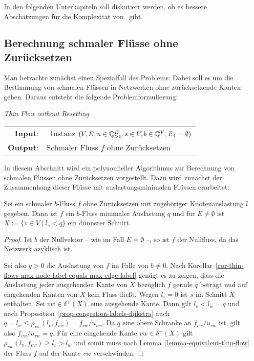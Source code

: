 In den folgenden Unterkapiteln soll diskutiert werden, ob es bessere Abschätzungen für die Komplexität von \probTFwR\ gibt.

\subsection{Berechnung schmaler Flüsse ohne Zurücksetzen}

Man betrachte zunächst einen Spezialfall des Problems:
Dabei soll es um die Bestimmung von schmalen Flüssen in Netzwerken ohne zurücksetzende Kanten gehen.
Daraus entsteht die folgende Problemformulierung:

\begin{center}
	\begin{mdframed}
		\centering
		\emph{Thin Flow without Resetting \probTFwoR} \\[1em]
		\begin{tabular}{rl}
			{\bfseries Input}: &\problemThinFlow\ Instanz $(V, E, u \in \mathbb{Q}^E_{>0}, s\in V, b\in \mathbb{Q}^V, E_1=\emptyset)$\\
			{\bfseries Output}: &Schmaler Fluss $f$ ohne Zurücksetzen
		\end{tabular}
	\end{mdframed}
\end{center}

In diesem Abschnitt wird ein polynomieller Algorithmus zur Berechnung von schmalen Flüssen ohne Zurücksetzen vorgestellt.
Dazu wird zunächst der Zusammenhang dieser Flüsse mit auslastungsminimalen Flüssen erarbeitet:

\begin{lemma}\label{lemma-thin-flows-without-resetting-have-minimal-congestion}
	Sei ein schmaler $b$-Fluss $f$ ohne Zurücksetzen mit zugehöriger Knotenauslastung $l$ gegeben.
	Dann ist $f$ ein $b$-Fluss minimaler Auslastung $q$ und für  $E\neq\emptyset$ ist $X:=\{ v\in V \mid l_v < q \}$ ein dünnster Schnitt.
\end{lemma}
\begin{proof}
	Ist $b$ der Nullvektor -- wie im Fall $E=\emptyset$ --, so ist $f$ der Nullfluss, da das Netzwerk azyklisch ist.
	
	Sei also $q>0$ die Auslastung von $f$ im Falle von $b\neq 0$.
	Nach Korollar~\ref{cor-thin-flows-max-node-label-equals-max-edge-label} genügt es zu
	zeigen, dass die Auslastung jeder ausgehenden Kante von $X$ bezüglich $f$ gerade $q$ beträgt und auf eingehenden Kanten von $X$ kein Fluss fließt.
	Wegen $l_s=0$ ist $s$ im Schnitt $X$ enthalten.
	Sei $vw\in\delta^+(X)$ eine ausgehende Kante.
	Dann gilt $l_v < l_w = q $ und nach Proposition~\ref{prop-congestion-labels-dijkstra} auch $q = l_w \leq \rho_{vw}(l_v, f_{vw}) = f_{vw} / u_{vw}$.
	Da $q$ eine obere Schranke an $f_{vw}/u_{vw}$ ist, gilt also $f_{vw}/u_{vw} = q$.
	Für eine eingehende Kante $vw\in\delta^-(X)$ gilt $\rho_{vw}(l_v, f_{vw})\geq l_v > l_w$ und somit muss nach Lemma~\ref{lemma-equivalent-thin-flow} der Fluss $f$ auf der Kante $vw$ verschwinden.
\end{proof}

